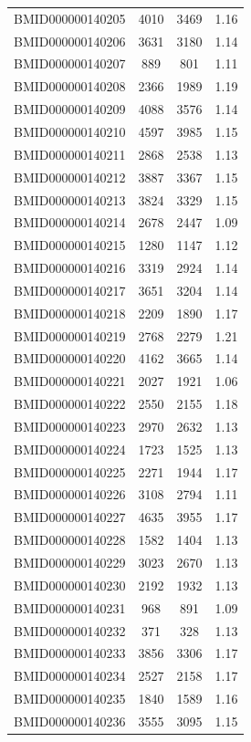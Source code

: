 \documentclass{bmcart}
\begin{document}
\begin{backmatter}
\begin{center}
\begin{longtable}{c|c|c|c}
\hline \hline
\endlastfoot
BMID000000140205 & 4010 & 3469 & 1.16 \\
BMID000000140206 & 3631 & 3180 & 1.14 \\
BMID000000140207 & 889 & 801 & 1.11 \\
BMID000000140208 & 2366 & 1989 & 1.19 \\
BMID000000140209 & 4088 & 3576 & 1.14 \\
BMID000000140210 & 4597 & 3985 & 1.15 \\
BMID000000140211 & 2868 & 2538 & 1.13 \\
BMID000000140212 & 3887 & 3367 & 1.15 \\
BMID000000140213 & 3824 & 3329 & 1.15 \\
BMID000000140214 & 2678 & 2447 & 1.09 \\
BMID000000140215 & 1280 & 1147 & 1.12 \\
BMID000000140216 & 3319 & 2924 & 1.14 \\
BMID000000140217 & 3651 & 3204 & 1.14 \\
BMID000000140218 & 2209 & 1890 & 1.17 \\
BMID000000140219 & 2768 & 2279 & 1.21 \\
BMID000000140220 & 4162 & 3665 & 1.14 \\
BMID000000140221 & 2027 & 1921 & 1.06 \\
BMID000000140222 & 2550 & 2155 & 1.18 \\
BMID000000140223 & 2970 & 2632 & 1.13 \\
BMID000000140224 & 1723 & 1525 & 1.13 \\
BMID000000140225 & 2271 & 1944 & 1.17 \\
BMID000000140226 & 3108 & 2794 & 1.11 \\
BMID000000140227 & 4635 & 3955 & 1.17 \\
BMID000000140228 & 1582 & 1404 & 1.13 \\
BMID000000140229 & 3023 & 2670 & 1.13 \\
BMID000000140230 & 2192 & 1932 & 1.13 \\
BMID000000140231 & 968 & 891 & 1.09 \\
BMID000000140232 & 371 & 328 & 1.13 \\
BMID000000140233 & 3856 & 3306 & 1.17 \\
BMID000000140234 & 2527 & 2158 & 1.17 \\
BMID000000140235 & 1840 & 1589 & 1.16 \\
BMID000000140236 & 3555 & 3095 & 1.15 \\

\end{longtable}
\end{center}
\end{backmatter}
\end{document}
